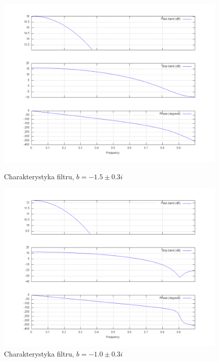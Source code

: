 \documentclass[wide,a4paper,titlepage,12pt]{mwart}
\begin{document}
  \begin{figure}[htbp]
    \begin{center}
      \includegraphics[scale=.3]{out/fig17.png}
      \caption{\label{fig17} Charakterystyka filtru, $b=-1.5\pm0.3i$}
      \includegraphics[scale=.3]{out/fig18.png}
      \caption{\label{fig18} Charakterystyka filtru, $b=-1.0\pm0.3i$}

    \end{center}
  \end{figure}
\end{document}
